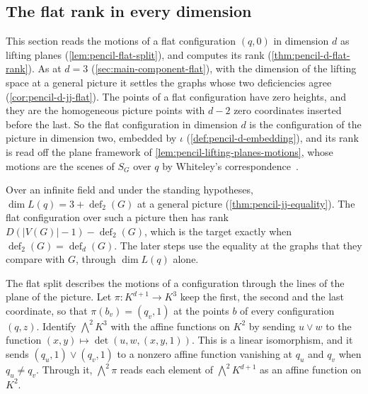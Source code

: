 \subsection{The flat rank in every dimension}
\label{sec:pencil-d-flat}

This section reads the motions of a flat configuration $(q, 0)$ in
dimension $d$ as lifting planes (\cref{lem:pencil-flat-split}), and
computes its rank (\cref{thm:pencil-d-flat-rank}). As at $d = 3$
(\cref{sec:main-component-flat}), with the dimension of the lifting
space at a general picture it settles the graphs whose two deficiencies
agree (\cref{cor:pencil-d-jj-flat}). The points of a flat configuration
have zero heights, and they are the homogeneous picture points with
$d - 2$ zero coordinates inserted before the last. So the flat
configuration in dimension $d$ is the configuration of the picture in
dimension two, embedded by $\iota$ (\cref{def:pencil-d-embedding}), and
its rank is read off the plane framework of
\cref{lem:pencil-lifting-planes-motions}, whose motions are the scenes
of $S_G$ over $q$ by Whiteley's
correspondence~\cite[Proposition~4.1]{whiteley1984}.

Over an infinite field and under the standing hypotheses,
$\dim L(q) = 3 + \operatorname{def}_2(G)$ at a general picture
(\cref{thm:pencil-jj-equality}). The flat configuration
over such a picture then has rank
$D(|V(G)| - 1) - \operatorname{def}_2(G)$, which is the target exactly
when $\operatorname{def}_2(G) = \operatorname{def}_d(G)$. The later steps
use the equality at the graphs that they compare with $G$, through
$\dim L(q)$ alone.

The flat split describes the motions of a configuration through the lines
of the plane of the picture. Let $\pi \colon K^{d+1} \to K^3$ keep the
first, the second and the last coordinate, so that
$\pi(b_v) = (q_v, 1)$ at the points $b$ of every configuration $(q, z)$.
Identify $\bigwedge^2 K^3$ with the affine functions on $K^2$ by sending
$u \vee w$ to the function $(x, y) \mapsto \det(u, w, (x, y, 1))$. This is
a linear isomorphism, and it sends $(q_u, 1) \vee (q_v, 1)$ to a nonzero
affine function vanishing at $q_u$ and $q_v$ when $q_u \neq q_v$. Through
it, $\bigwedge^2 \pi$ reads each element of $\bigwedge^2 K^{d+1}$ as an
affine function on $K^2$.

